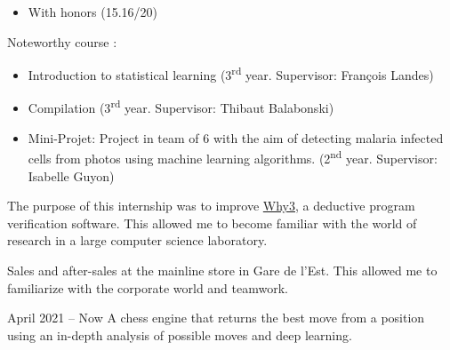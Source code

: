 \documentclass[10pt,a4paper,ragged2e,withhyper]{altacv}
\begin{document}
\begin{paracol}{2}
            \begin{itemize}
                \item With honors (15.16/20)
            \end{itemize}

            Noteworthy course :
            \begin{itemize}
                \item Introduction to statistical learning (3\textsuperscript{rd} year. Supervisor: François Landes)
                \item Compilation (3\textsuperscript{rd} year. Supervisor: Thibaut Balabonski)
                \item Mini-Projet: Project in team of 6 with the aim of detecting malaria infected cells from photos
                using machine learning algorithms.
                (2\textsuperscript{nd} year. Supervisor: Isabelle Guyon)
            \end{itemize}
            

            The purpose of this internship was to improve \href{http://why3.lri.fr/}{Why3}, a deductive program verification software.
            This allowed me to become familiar with the world of research in a large computer science laboratory.

            \divider

            Sales and after-sales at the mainline store in Gare de l'Est. This allowed me to familiarize with the corporate world and teamwork.
        
        \pagebreak
            {April 2021 -- Now}{}
            A chess engine that returns the best move from a position using an in-depth analysis of possible moves and deep learning.\\
            \\
            \vspace{4pt}
            \divider


\end{paracol}
\end{document}
